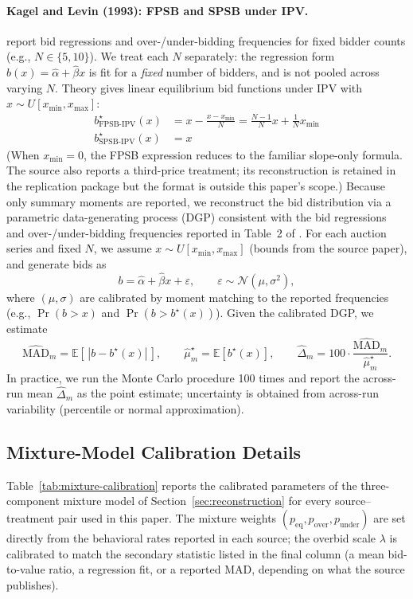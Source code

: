 \paragraph{Kagel and Levin (1993): FPSB and SPSB under IPV.}
\citet{kagel1993independent} report bid regressions and over-/under-bidding frequencies for fixed bidder counts (e.g., $N\in\{5, 10\}$). We treat each $N$ separately: the regression form $\hat b(x)=\hat\alpha+\hat\beta x$ is fit for a \emph{fixed} number of bidders, and is not pooled across varying $N$.
Theory gives linear equilibrium bid functions under IPV with $x\sim U[x_{\min},x_{\max}]$:
$$\begin{aligned}
b^\star_{\mathrm{FPSB\text{-}IPV}}(x) &= x - \frac{x-x_{\min}}{N} = \frac{N-1}{N}x + \frac{1}{N}x_{\min} \\
b^\star_{\mathrm{SPSB\text{-}IPV}}(x) &= x
\end{aligned}$$
(When $x_{\min}=0$, the FPSB expression reduces to the familiar slope-only formula. The source also reports a third-price treatment; its reconstruction is retained in the replication package but the format is outside this paper's scope.)
Because only summary moments are reported, we reconstruct the bid distribution via a parametric data-generating process (DGP) consistent with the bid regressions and over-/under-bidding frequencies reported in Table~2 of \citet{kagel1993independent}.
For each auction series and fixed $N$, we assume $x\sim U[x_{\min},x_{\max}]$ (bounds from the source paper), and generate bids as
\[
b = \hat\alpha+\hat\beta x + \varepsilon,\qquad \varepsilon\sim \mathcal N(\mu,\sigma^2),
\]
where $(\mu,\sigma)$ are calibrated by moment matching to the reported frequencies (e.g., $\Pr(b>x)$ and $\Pr(b>b^\star(x))$).
Given the calibrated DGP, we estimate
\[
\widehat{\mathrm{MAD}}_m = \mathbb E\!\left[\,|b-b^\star(x)|\,\right],
\qquad
\widehat{\mu}_m^\star=\mathbb E[b^\star(x)],
\qquad
\widehat{\Delta}_m = 100\cdot \frac{\widehat{\mathrm{MAD}}_m}{\widehat{\mu}_m^\star}.
\]
In practice, we run the Monte Carlo procedure 100 times and report the across-run mean $\widehat{\Delta}_m$ as the point estimate; uncertainty is obtained from across-run variability (percentile or normal approximation).

\subsection{Mixture-Model Calibration Details}\label{app:mixture}

Table~\ref{tab:mixture-calibration} reports the calibrated parameters of the three-component mixture model of Section~\ref{sec:reconstruction} for every source--treatment pair used in this paper. The mixture weights $(p_{\text{eq}}, p_{\text{over}}, p_{\text{under}})$ are set directly from the behavioral rates reported in each source; the overbid scale $\lambda$ is calibrated to match the secondary statistic listed in the final column (a mean bid-to-value ratio, a regression fit, or a reported MAD, depending on what the source publishes).

